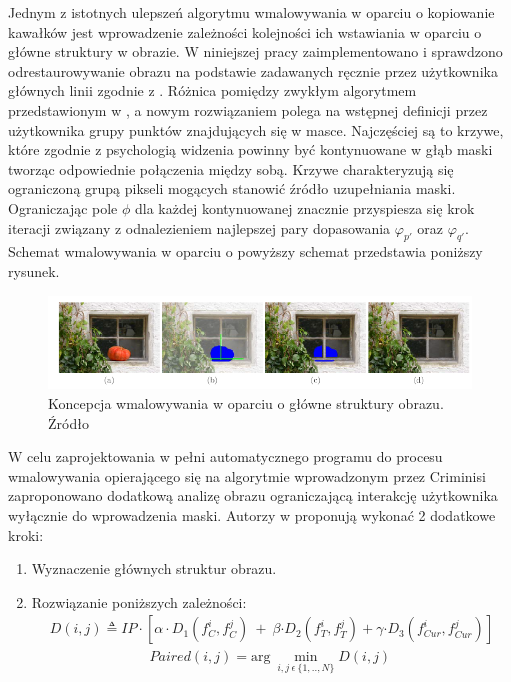 \documentclass[12pt, twoside, openany]{report}
\theoremstyle{definition}
\begin{document}
Jednym z istotnych ulepszeń algorytmu wmalowywania w oparciu o kopiowanie kawałków jest wprowadzenie zależności kolejności ich wstawiania w oparciu o główne struktury w obrazie. W niniejszej pracy zaimplementowano i sprawdzono odrestaurowywanie obrazu na podstawie zadawanych ręcznie przez użytkownika głównych linii zgodnie z \cite{StructurePropagationManual}. Różnica pomiędzy zwykłym algorytmem przedstawionym w \cite{criminisi2004region}, a nowym rozwiązaniem polega na wstępnej definicji przez użytkownika grupy punktów znajdujących się w masce. Najczęściej są to krzywe, które zgodnie z psychologią widzenia powinny być kontynuowane w głąb maski tworząc odpowiednie połączenia między sobą. Krzywe charakteryzują się ograniczoną grupą pikseli mogących stanowić źródło uzupełniania maski. Ograniczając pole $\phi $ dla każdej kontynuowanej znacznie przyspiesza się krok iteracji związany z odnalezieniem najlepszej pary dopasowania ${\varphi }_{p'}$ oraz ${\varphi }_{q'}$. Schemat wmalowywania w oparciu o powyższy schemat przedstawia poniższy rysunek.
\begin{figure}[!h]
	\centering
	\includegraphics[scale=0.8]{rysunki/4_fig4}
	\caption{Koncepcja wmalowywania w oparciu o główne struktury obrazu. Źródło \cite{StructurePropagationManual}}
	\label{4_fig4} 
\end{figure}
W celu zaprojektowania w pełni automatycznego programu do procesu wmalowywania opierającego się na algorytmie wprowadzonym przez Criminisi zaproponowano dodatkową analizę obrazu ograniczającą interakcję użytkownika wyłącznie do wprowadzenia maski. Autorzy w \cite{SalientStrucTexProp} proponują wykonać 2 dodatkowe kroki:
\begin{enumerate}
\item
Wyznaczenie głównych struktur obrazu.
\item
Rozwiązanie poniższych zależności:
\begin{align}
D(i,j)\triangleq IP\cdot \left[\alpha \cdot D_1\left(f^i_C,f^j_C\right)\ +\ \beta {\cdot D}_2\left(f^i_T,f^j_T\right)+\gamma {\cdot D}_3\left(f^i_{Cur},f^j_{Cur}\right)\right]
\label{SalientDistance}
\end{align}
\begin{align}
Paired\left(i,j\right)={\mathrm{arg}\ \mathop{\mathrm{min}}_{i,j\ \epsilon \mathrm{\ }\{1,..,N\}} D(i,j)\ }
\label{SalientPair}
\end{align}
\end{enumerate}
\end{document}
